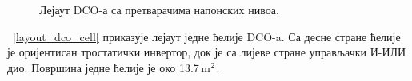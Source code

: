 \documentclass[master]{finthesis}
\def \DCO  {DCO} %
\begin{document}
\begin{figure}[!ht]
	 \centering
	\caption{Лејаут \DCO-а са претварачима напонских нивоа.}
	\label{layout_dco5_130}
\end{figure}
\figurename~\ref{layout_dco_cell} приказује лејаут једне ћелије \DCO-a. Са десне стране ћелије је оријентисан тростатички инвертор, док је са лијеве стране управљачки И-ИЛИ дио. Површина једне ћелије је око 13.7\,\text\textmu m$^\text2$. \par
\end{document}
